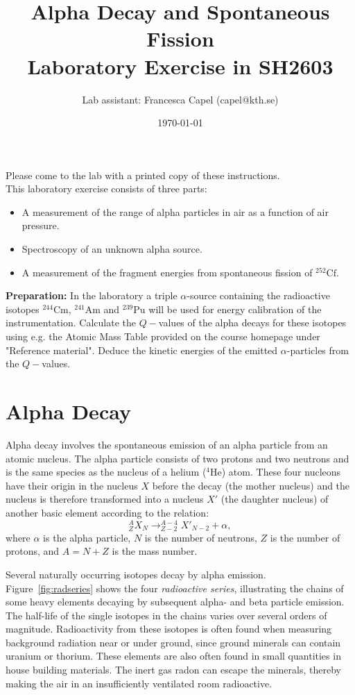 \documentclass[12pt]{article}
\title{\textbf{Alpha Decay and Spontaneous Fission} \\
  \large Laboratory Exercise in SH2603}
\author{Lab assistant: Francesca Capel (capel@kth.se)}
\date{\today}
\begin{document}
\maketitle

\noindent Please come to the lab with a printed copy of these instructions.\\

\noindent
This laboratory exercise consists of three parts:
\begin{itemize}
\item A measurement of the range of alpha particles in air as a
  function of air pressure.
\item  Spectroscopy of an unknown alpha source.
\item  A measurement of the fragment energies from spontaneous fission
  of $^{252}\mbox{Cf}$. 


\end{itemize}

\noindent
{\bf Preparation:} In the laboratory a triple $\alpha$-source
containing the radioactive isotopes $^{244}\mbox{Cm}$, $^{241}\mbox{Am}$ 
and $^{239}\mbox{Pu}$ will be used for energy calibration of the
instrumentation. Calculate the $Q-$values of the alpha decays for these isotopes
using e.g. the Atomic Mass Table provided on the course homepage under "Reference material".
 Deduce the kinetic energies of the emitted
$\alpha$-particles from the $Q-$values.

\section*{Alpha Decay}
Alpha decay involves the spontaneous emission of an alpha particle
from an atomic nucleus. The alpha particle consists of two protons and
two neutrons and is the same species as the nucleus of a helium
($^{4}\mbox{He}$) atom.  These four nucleons have their origin in the
nucleus $X$ before the decay (the mother nucleus) and the nucleus is
therefore transformed into a nucleus $X'$ (the daughter nucleus) of
another basic element according to the relation:
\begin{equation}
^{A}_{Z}X_{N} \rightarrow ^{A-4}_{Z-2}X'_{N-2}+\alpha,
\end{equation}
where $\alpha$ is the alpha particle, $N$ is the number of neutrons,
$Z$ is the number of protons, and $A=N+Z$ is the mass number.

Several naturally occurring isotopes decay by alpha emission.
Figure~\ref{fig:radseries} shows the four \emph{radioactive series},
illustrating the chains of some heavy elements decaying by subsequent
alpha- and beta particle emission. The half-life of the single
isotopes in the chains varies over several orders of magnitude.
Radioactivity from these isotopes is often found when measuring
background radiation near or under ground, since ground minerals 
can contain uranium or thorium. These elements are also
often found in small quantities in house building materials. The inert
gas radon can escape the minerals, thereby making the air in an
insufficiently ventilated room radioactive.
\end{document}
